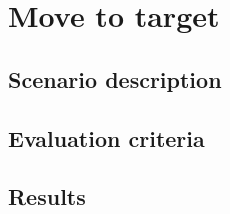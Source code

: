 


\section{Move to target \label{sec:moveToTarget}}

\subsection{Scenario description}

\subsection{Evaluation criteria}

\subsection{Results}